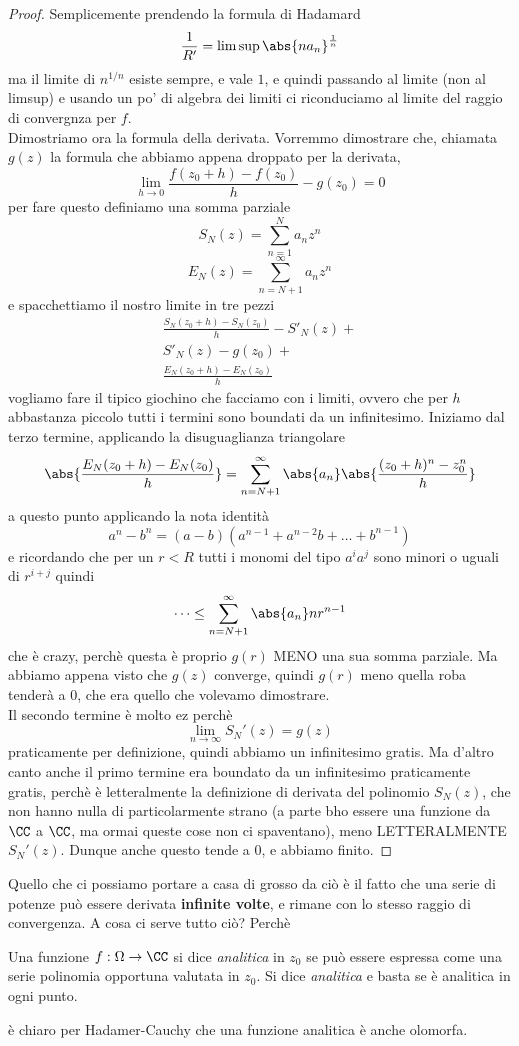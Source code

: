 \documentclass[11pt]{scrartcl}
\begin{document}
	\begin{proof}
		Semplicemente prendendo la formula di Hadamard
		$$\frac{1}{R'}=\limsup\abs{na_n}^{\frac{1}{n}}$$
		ma il limite di $n^{1/n}$ esiste sempre, e vale $1$, e quindi passando al limite (non al limsup) e usando un po' di algebra dei limiti ci riconduciamo al limite del raggio di convergnza per $f$. \\ 
		Dimostriamo ora la formula della derivata. Vorremmo dimostrare che, chiamata $g(z)$ la formula che abbiamo appena droppato per la derivata, 
		$$\lim_{h\to 0}\frac{f(z_0+h)-f(z_0)}{h}-g(z_0)=0$$
		per fare questo definiamo una somma parziale
		$$S_N(z)=\sum_{n=1}^N a_nz^n$$
		$$E_N(z)=\sum_{n=N+1}^\infty a_nz^n$$
		e spacchettiamo il nostro limite in tre pezzi
		\begin{align*}
			\frac{S_N(z_0+h)-S_N(z_0)}{h}-S'_N(z)+ \\
			S'_N(z)-g(z_0)+\\
			\frac{E_N(z_0+h)-E_N(z_0)}{h}
		\end{align*}
		vogliamo fare il tipico giochino che facciamo con i limiti, ovvero che per $h$ abbastanza piccolo tutti i termini sono boundati da un infinitesimo. Iniziamo dal terzo termine, applicando la disuguaglianza triangolare
		$$\abs{\frac{E_N(z_0+h)-E_N(z_0)}{h}}=\sum_{n=N+1}^\infty \abs{a_n}\abs{\frac{(z_0+h)^n-z_0^n}{h}}$$
		a questo punto applicando la nota identità
		$$a^n-b^n=(a-b)(a^{n-1}+a^{n-2}b+\dots +b^{n-1})$$
		e ricordando che per un $r<R$ tutti i monomi del tipo $a^ia^j$ sono minori o uguali di $r^{i+j}$ quindi 
		$$\dots \le \sum_{n=N+1}^\infty \abs{a_n}nr^{n-1}$$
		che è crazy, perchè questa è proprio $g(r)$ MENO una sua somma parziale. Ma abbiamo appena visto che $g(z)$ converge, quindi $g(r)$ meno quella roba tenderà a $0$, che era quello che volevamo dimostrare. \\
		Il secondo termine è molto ez perchè 
		$$\lim_{n\to\infty}S_N'(z)=g(z)$$
		praticamente per definizione, quindi abbiamo un infinitesimo gratis. Ma d'altro canto anche il primo termine era boundato da un infinitesimo praticamente gratis, perchè è letteralmente la definizione di derivata del polinomio $S_N(z)$, che non hanno nulla di particolarmente strano (a parte bho essere una funzione da $\CC$ a $\CC$, ma ormai queste cose non ci spaventano), meno LETTERALMENTE $S_N'(z)$. Dunque anche questo tende a $0$, e abbiamo finito.
	\end{proof}
	Quello che ci possiamo portare a casa di grosso da ciò è il fatto che una serie di potenze può essere derivata \textbf{infinite volte}, e rimane con lo stesso raggio di convergenza. A cosa ci serve tutto ciò? Perchè
	\begin{definition}
		Una funzione $f:\Omega\to\CC$ si dice \textit{analitica} in $z_0$ se può essere espressa come una serie polinomia opportuna valutata in $z_0$. Si dice \textit{analitica} e basta se è analitica in ogni punto.
	\end{definition}
	è chiaro per Hadamer-Cauchy che una funzione analitica è anche olomorfa.
\end{document}

